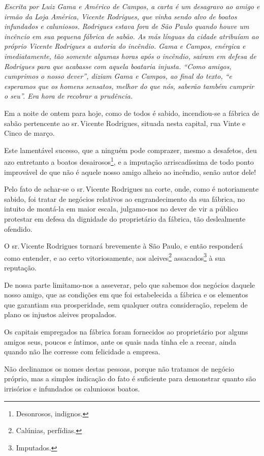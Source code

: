 \begin{didascalia}
\emph{Escrita por Luiz Gama e Américo de Campos, a carta é um desagravo
ao amigo e irmão da Loja América, Vicente Rodrigues, que vinha sendo
alvo de boatos infundados e caluniosos. Rodrigues estava fora de São
Paulo quando houve um incêncio em sua pequena fábrica de sabão. As más
línguas da cidade atribuíam ao próprio Vicente Rodrigues a autoria do
incêndio. Gama e Campos, enérgica e imediatamente, tão somente algumas
horas após o incêndio, saíram em defesa de Rodrigues para que acabasse
com aquela boataria injusta. ``Como amigos, cumprimos o nosso dever'',
diziam Gama e Campos, ao final do texto, ``e esperamos que os homens
sensatos, melhor do que nós, saberão também cumprir o seu''. Era hora de
recobrar a prudência.}
\end{didascalia}

Em a noite de ontem para hoje, como de todos é sabido, incendiou-se a
fábrica de sabão pertencente ao sr.\,Vicente Rodrigues, situada nesta
capital, rua Vinte e Cinco de março.

Este lamentável sucesso, que a ninguém pode comprazer, mesmo a
desafetos, deu azo entretanto a boatos desairosos\footnote{ Desonrosos,
  indignos.}, e a imputação arriscadíssima de todo ponto improvável de
que não é aquele nosso amigo alheio ao incêndio, senão autor dele!

Pelo fato de achar-se o sr.\,Vicente Rodrigues na corte, onde, como é
notoriamente sabido, foi tratar de negócios relativos ao engrandecimento
da sua fábrica, no intuito de montá-la em maior escala, julgamo-nos no
dever de vir a público protestar em defesa da dignidade do proprietário
da fábrica, tão deslealmente ofendido.

O sr.\,Vicente Rodrigues tornará brevemente à São Paulo, e então
responderá como entender, e ao certo vitoriosamente, aos
aleives\footnote{ Calúnias, perfídias.} assacados\footnote{ Imputados.}
à sua reputação.

De nossa parte limitamo-nos a asseverar, pelo que sabemos dos negócios
daquele nosso amigo, que as condições em que foi estabelecida a fábrica
e os elementos que garantiam sua prosperidade, sem qualquer outra
consideração, repelem de plano os injustos aleives propalados.

Os capitais empregados na fábrica foram fornecidos ao proprietário por
alguns amigos seus, poucos e íntimos, ante os quais nada tinha ele a
recear, ainda quando não lhe corresse com felicidade a empresa.

Não declinamos os nomes destas pessoas, porque não tratamos de negócio
próprio, mas a simples indicação do fato é suficiente para demonstrar
quanto são irrisórios e infundados os caluniosos boatos.

